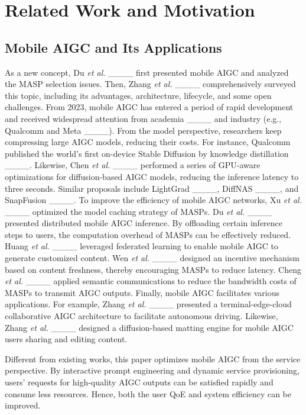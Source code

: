 \section{Related Work and Motivation}
\subsection{Mobile AIGC and Its Applications}
As a new concept, Du \textit{et al.} ____ first presented mobile AIGC and analyzed the MASP selection issues.
Then, Zhang \textit{et al.} ____ comprehensively surveyed this topic, including its advantages, architecture, lifecycle, and some open challenges.
From 2023, mobile AIGC has entered a period of rapid development and received widespread attention from academia ____ and industry (e.g., Qualcomm and Meta ____).
From the model perspective, researchers keep compressing large AIGC models, reducing their costs. For instance, Qualcomm published the world's first on-device Stable Diffusion by knowledge distillation ____. Likewise, Chen \textit{et al.} ____ performed a series of GPU-aware optimizations for diffusion-based AIGC models, reducing the inference latency to three seconds. Similar proposals include LightGrad ____, DiffNAS ____, and SnapFusion ____. 
To improve the efficiency of mobile AIGC networks, Xu \textit{et al.} ____ optimized the model caching strategy of MASPs. Du \textit{et al.} ____ presented distributed mobile AIGC inference. 
By offloading certain inference steps to users, the computation overhead of MASPs can be effectively reduced. Huang \textit{et al.} ____ leveraged federated learning to enable mobile AIGC to generate customized content. 
Wen \textit{et al.} ____ designed an incentive mechanism based on content freshness, thereby encouraging MASPs to reduce latency. 
Cheng \textit{et al.} ____ applied semantic communications to reduce the bandwidth costs of MASPs to transmit AIGC outputs.
Finally, mobile AIGC facilitates various applications. 
For example, Zhang \textit{et al.} ____ presented a terminal-edge-cloud collaborative AIGC architecture to facilitate autonomous driving. Likewise, Zhang \textit{et al.} ____ designed a diffusion-based matting engine for mobile AIGC users sharing and editing content.

Different from existing works, this paper optimizes mobile AIGC from the service perspective.
By interactive prompt engineering and dynamic service provisioning, users' requests for high-quality AIGC outputs can be satisfied rapidly and consume less resources.
Hence, both the user QoE and system efficiency can be improved.

